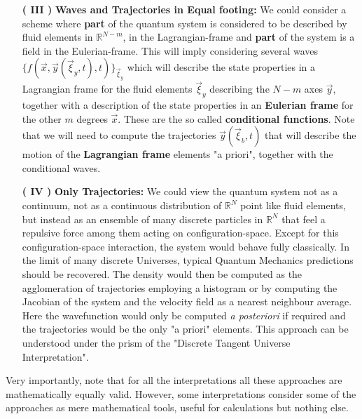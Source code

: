 \documentclass[11pt, a4paper]{article} %
\newcommand{\R}{\mathbb{R}} %
\begin{document}
\begin{enumerate}
\item[{\bf ( III )}]{\bf Waves and Trajectories in Equal footing: } We could consider a scheme where {\bf part} of the quantum system is considered to be described by fluid elements in $\R^{N-m}$, in the Lagrangian-frame and {\bf part} of the system is a field in the Eulerian-frame. This will imply considering several waves $\{ f(\vec{x}, \vec{y}(\vec{\xi}_y,t), t) \}_{\vec{\xi}_y}$ which will describe the state properties in a Lagrangian frame for the fluid elements $\vec{\xi}_y$ describing the $N-m$ axes $\vec{y}$, together with a description of the state properties in an {\bf Eulerian frame} for the other $m$ degrees $\vec{x}$. These are the so called {\bf conditional functions}. Note that we will need to compute the trajectories $\vec{y}(\vec{\xi}_b,t)$ that will describe the motion of the {\bf Lagrangian frame} elements "a priori", together with the conditional waves. 


\item[\bf ( IV ) ]{\bf Only Trajectories: } We could view the quantum system not as a continuum, not as a continuous distribution of $\R^N$ point like fluid elements, but instead as an ensemble of many discrete particles in $\R^N$ that feel a repulsive force among them acting on configuration-space. Except for this configuration-space interaction, the system would behave fully classically. In the limit of many discrete Universes, typical Quantum Mechanics predictions should be recovered. The density would then be computed as the agglomeration of trajectories employing a histogram or by computing the Jacobian of the system and the velocity field as a nearest neighbour average. Here the wavefunction would only be computed {\em a posteriori} if required and the trajectories would be the only "a priori" elements. This approach can be understood under the prism of the "Discrete Tangent Universe Interpretation".\vspace{-0.2cm}
\end{enumerate}
Very importantly, note that for all the interpretations all these approaches are mathematically equally valid. However, some interpretations consider some of the approaches as mere mathematical tools, useful for calculations but nothing else.
\end{document}
